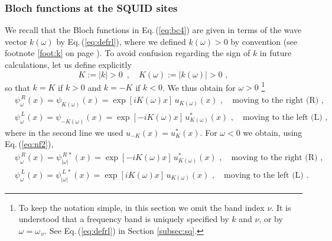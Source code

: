 \subsubsection{Bloch functions at the SQUID sites} \label{subsubsec:bloch_functions}
%
We recall that the Bloch functions in Eq.\,(\ref{eq:bc4}) are given in terms of the wave vector $k(\omega)$
by Eq.\,(\ref{eq:defrl}), where we defined $k(\omega)>0$ by convention (see footnote \ref{foot:k} on 
page \pageref{foot:k}). To avoid confusion regarding the sign of $k$ in future calculations, let us define
explicitly 
%
\begin{equation} \label{eq:kdef}
K := |k| > 0 \, \, \, , \quad K(\omega) := |k(\omega)| > 0 \, \, ,
\end{equation}
%
so that $k = K$ if $k>0$ and $k = - K$ if $k<0$. We thus obtain for $\omega>0$
%
\color{red}
\footnote{To keep the notation simple, in this section we omit the band index $\nu$. It is 
understood that a frequency band is uniquely specified by $k$ and $\nu$, or by 
$\omega = \omega_{\,\nu}$. See Eq.\,(\ref{eq:defrl}) in Section \ref{subsec:sq}.}
\color{black}
%
\begin{subequations} \label{eq:bloch3}
\begin{eqnarray}
& \psi_{\omega}^{\,R}(x) = \psi_{K(\omega)}(x) = \exp\left[i K(\omega) x\right] \, u_{K(\omega)}(x)
\, \, , \quad \text{moving to the right (R)} \, \, , \\[2mm]
& \psi_{\omega}^{\,L}(x) = \psi_{-K(\omega)}(x) = \exp\left[- i K(\omega) x\right] \, u_{K(\omega)}^*(x)
\, \, , \quad \text{moving to the left (L)} \, \, ,
\end{eqnarray}
\end{subequations}
%
where in the second line we used $u_{-K}(x) = u_K^*(x)$. For $\omega<0$ we obtain, 
using Eq.\,(\ref{eq:nf2}),
%
\begin{subequations} \label{eq:bloch3_neg}
\begin{eqnarray}
& \psi_{\omega}^{\,R}(x) = \psi_{|\omega|}^{\,R \, *}(x)
= \exp\left[- i K(\omega) x \right] \, u_{K(\omega)}^*(x) 
\, \, , \quad \text{moving to the right (R)} \, \, , \\[2mm]
& \psi_{\omega}^{\,L}(x) = \psi_{|\omega|}^{\,L \, *}(x)
= \exp\left[i K(\omega) x \right] \, u_{K(\omega)}(x) 
\, \, , \quad \text{moving to the left (L)} \, \, .
\end{eqnarray}
\end{subequations}

